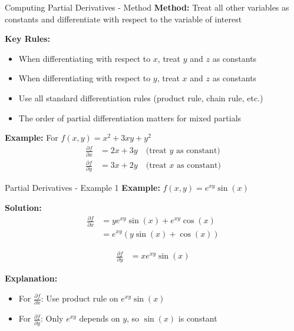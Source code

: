 \documentclass[aspectratio=169]{beamer}
\begin{document}
\begin{frame}{Computing Partial Derivatives - Method}
\textbf{Method:} Treat all other variables as constants and differentiate with respect to the variable of interest

\textbf{Key Rules:}
\begin{itemize}
    \item When differentiating with respect to $x$, treat $y$ and $z$ as constants
    \item When differentiating with respect to $y$, treat $x$ and $z$ as constants
    \item Use all standard differentiation rules (product rule, chain rule, etc.)
    \item The order of partial differentiation matters for mixed partials
\end{itemize}

\textbf{Example:} For $f(x,y) = x^2 + 3xy + y^2$
\begin{align*}
    \frac{\partial f}{\partial x} &= 2x + 3y \quad \text{(treat $y$ as constant)} \\
    \frac{\partial f}{\partial y} &= 3x + 2y \quad \text{(treat $x$ as constant)}
\end{align*}
\end{frame}

\begin{frame}{Partial Derivatives - Example 1}
\textbf{Example:} $f(x,y) = e^{xy} \sin(x)$

\textbf{Solution:}
\begin{align*}
    \frac{\partial f}{\partial x} &= ye^{xy} \sin(x) + e^{xy} \cos(x) \\
    &= e^{xy}(y\sin(x) + \cos(x))
\end{align*}

\begin{align*}
    \frac{\partial f}{\partial y} &= xe^{xy} \sin(x)
\end{align*}

\textbf{Explanation:}
\begin{itemize}
    \item For $\frac{\partial f}{\partial x}$: Use product rule on $e^{xy} \sin(x)$
    \item For $\frac{\partial f}{\partial y}$: Only $e^{xy}$ depends on $y$, so $\sin(x)$ is constant
\end{itemize}
\end{frame}
\end{document}
